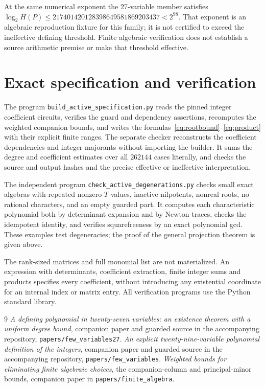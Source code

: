 \documentclass[11pt,a4paper]{article}
\begin{document}
At the same numerical exponent the 27-variable member satisfies
$\log_2 H(P)\le217401420128398649581869203437<2^{98}$.
That exponent is an algebraic reproduction fixture for this family;
it is not certified to exceed the ineffective defining threshold.
Finite algebraic verification does not establish a source arithmetic
premise or make that threshold effective.

\section{Exact specification and verification}

The program \nolinkurl{build_active_specification.py} reads the
pinned integer coefficient circuits, verifies the guard and dependency
assertions, recomputes the weighted companion bounds, and writes
the formulas~\eqref{eq:rootbound}--\eqref{eq:product} with their
explicit finite ranges. The separate checker reconstructs the
coefficient dependencies and integer majorants without importing
the builder. It sums the degree and coefficient estimates over
all $262144$ cases literally, and checks the source and output
hashes and the precise effective or ineffective interpretation.

The independent program \nolinkurl{check_active_degenerations.py}
checks small exact algebras with repeated nonzero $T$-values,
inactive nilpotents, nonreal roots, no rational characters, and
an empty guarded part. It computes each characteristic polynomial
both by determinant expansion and by Newton traces, checks the
idempotent identity, and verifies squarefreeness by an exact
polynomial gcd. These examples test degeneracies; the proof of the
general projection theorem is given above.

The rank-sized matrices and full monomial list are not materialized.
An expression with determinants, coefficient extraction, finite
integer sums and products specifies every coefficient, without
introducing any existential coordinate for an internal index or
matrix entry. All verification programs use the Python standard library.

\begin{thebibliography}{9}
\emph{A defining polynomial in twenty-seven variables:
an existence theorem with a uniform degree bound},
companion paper and guarded source in the accompanying repository,
\nolinkurl{papers/few_variables27}.
\emph{An explicit twenty-nine-variable polynomial definition of the integers},
companion paper and guarded source in the accompanying repository,
\nolinkurl{papers/few_variables}.
\emph{Weighted bounds for eliminating finite algebraic choices},
the companion-column and principal-minor bounds,
companion paper in \nolinkurl{papers/finite_algebra}.
\end{thebibliography}
\end{document}
